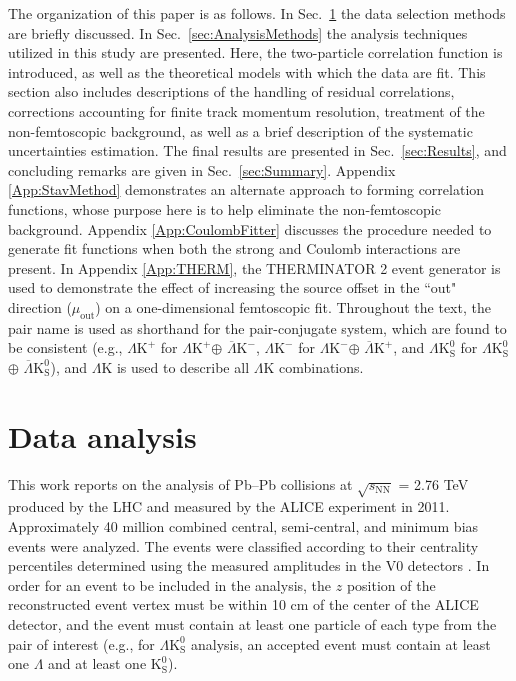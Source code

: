 \documentclass[ALICE,manyauthors]{cernphprep}
\newcommand{\Lam}{$\Lambda$\xspace}
\newcommand{\Ks}{$\mathrm{K^{0}_{S}}$\xspace}
\newcommand{\LamK}{$\Lambda$K\xspace}
\newcommand{\LamKchP}{$\Lambda\mathrm{K^{+}}$\xspace}
\newcommand{\ALamKchM}{$\overline{\Lambda}\mathrm{K^{-}}$\xspace}
\newcommand{\LamKchM}{$\Lambda\mathrm{K^{-}}$\xspace}
\newcommand{\ALamKchP}{$\overline{\Lambda}\mathrm{K^{+}}$\xspace}
\newcommand{\LamKs}{$\Lambda\mathrm{K^{0}_{S}}$\xspace}
\newcommand{\ALamKs}{$\overline{\Lambda}\mathrm{K^{0}_{S}}$\xspace}
\begin{document}
The organization of this paper is as follows.  
In Sec.\ \ref{sec:DataAnalysis} the data selection methods are briefly discussed.
In Sec.\ \ref{sec:AnalysisMethods} the analysis techniques utilized in this study are presented.  
Here, the two-particle correlation function is introduced, as well as the theoretical models with which the data are fit.  
This section also includes descriptions of the handling of residual correlations, corrections accounting for finite track momentum resolution, treatment of the non-femtoscopic background, as well as a brief description of the systematic uncertainties estimation.  
The final results are presented in Sec.\ \ref{sec:Results}, and concluding remarks are given in Sec.\ \ref{sec:Summary}.
Appendix \ref{App:StavMethod} demonstrates an alternate approach to forming correlation functions, whose purpose here is to help eliminate the non-femtoscopic background.
Appendix \ref{App:CoulombFitter} discusses the procedure needed to generate fit functions when both the strong and Coulomb interactions are present.
In Appendix \ref{App:THERM}, the THERMINATOR 2 event generator is used to demonstrate the effect of increasing the source offset in the ``out" direction ($\mu_{\mathrm{out}}$) on a one-dimensional femtoscopic fit.
Throughout the text, the pair name is used as shorthand for the pair-conjugate system, which are found to be consistent (e.g., \LamKchP for \LamKchP $\oplus$ \ALamKchM, \LamKchM for \LamKchM $\oplus$ \ALamKchP, and \LamKs for \LamKs $\oplus$ \ALamKs), and \LamK is used to describe all \LamK combinations.

\section{Data analysis}
\label{sec:DataAnalysis}

This work reports on the analysis of Pb--Pb collisions at $\sqrt{s_{\mathrm{NN}}}$ = 2.76 TeV produced by the LHC and measured by the ALICE experiment \cite{Aamodt:2008zz} in 2011.
Approximately 40 million combined central, semi-central, and minimum bias events were analyzed.
The events were classified according to their centrality percentiles determined using the measured amplitudes in the V0 detectors \cite{Abelev:2013qoq}.  
In order for an event to be included in the analysis, the $z$ position of the reconstructed event vertex must be within 10 cm of the center of the ALICE detector, and the event must contain at least one particle of each type from the pair of interest (e.g., for \LamKs analysis, an accepted event must contain at least one \Lam and at least one \Ks). 
\end{document}
